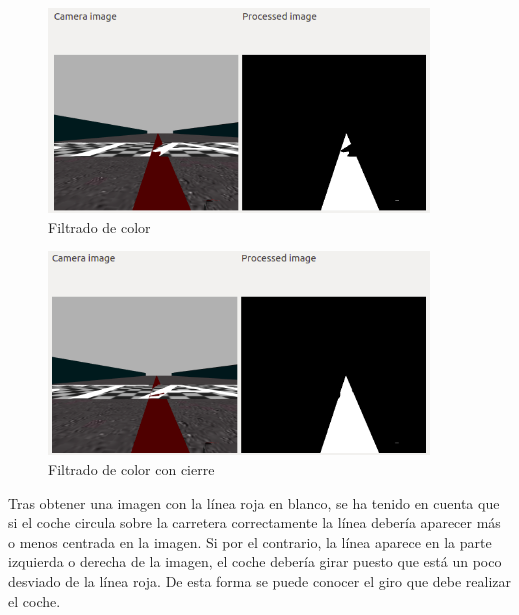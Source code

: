 \begin{figure}[H]
  \begin{center}
    \includegraphics[width=0.9\textwidth]{figures/Infraestructura/filtro_color.png}
		\caption{Filtrado de color}
		\label{fig.color}
		\end{center}
\end{figure}


\begin{figure}[H]
  \begin{center}
    \includegraphics[width=0.9\textwidth]{figures/Infraestructura/filtro_cierre.png}
		\caption{Filtrado de color con cierre}
		\label{fig.cierre}
		\end{center}
\end{figure}

Tras obtener una imagen con la línea roja en blanco, se ha tenido en cuenta que si el coche circula sobre la carretera correctamente la línea debería aparecer más o menos centrada en la imagen. Si por el contrario, la línea aparece en la parte izquierda o derecha de la imagen, el coche debería girar puesto que está un poco desviado de la línea roja. De esta forma se puede conocer el giro que debe realizar el coche.\\


